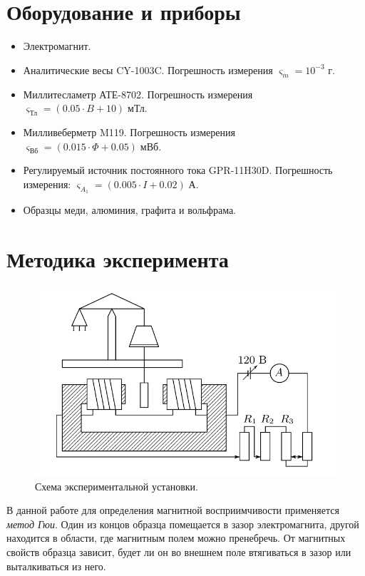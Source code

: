 \documentclass[12pt,a4paper]{article}
\begin{document}
	\section*{Оборудование и приборы}
	\begin{itemize}[itemsep = 0pt, parsep=0pt]
		\item Электромагнит.
		\item Аналитические весы CY-1003C. Погрешность измерения $\varsigma_m = 10^{-3}$ г.
		\item Миллитесламетр АТЕ-8702. Погрешность измерения $\varsigma_{\text{Тл}} = (0.05 \cdot B + 10) \; \text{мТл}$.
		\item Милливеберметр M119. Погрешность измерения  $\varsigma_{\text{Вб}} = (0.015 \cdot \Phi + 0.05) \; \text{мВб}$.
		\item Регулируемый источник постоянного тока GPR-11H30D. Погрешность измерения: $\varsigma_{A_1} = (0.005 \cdot I + 0.02) \; \text{А}$.
		\item Образцы меди, алюминия, графита и вольфрама.
	\end{itemize}
	
	\section*{Методика эксперимента}
	
	\begin{figure}
		\vspace{-10pt}
		\includegraphics[width=\linewidth]{res/scheme.png}
		\caption{Схема экспериментальной установки.}
		\label{img:scheme}
	\end{figure}
		
	В данной работе для определения магнитной восприимчивости применяется \textit{метод Гюи}. Один из концов образца помещается в зазор электромагнита, другой находится в области, где магнитным полем можно пренебречь. От магнитных свойств образца зависит, будет ли он во внешнем поле втягиваться в зазор или выталкиваться из него.
	
\end{document}
